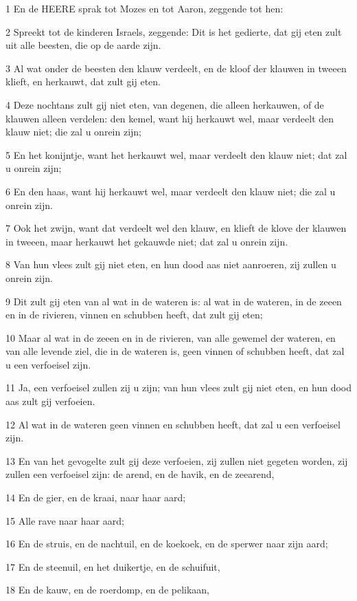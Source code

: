 \par 1 En de HEERE sprak tot Mozes en tot Aaron, zeggende tot hen:
\par 2 Spreekt tot de kinderen Israels, zeggende: Dit is het gedierte, dat gij eten zult uit alle beesten, die op de aarde zijn.
\par 3 Al wat onder de beesten den klauw verdeelt, en de kloof der klauwen in tweeen klieft, en herkauwt, dat zult gij eten.
\par 4 Deze nochtans zult gij niet eten, van degenen, die alleen herkauwen, of de klauwen alleen verdelen: den kemel, want hij herkauwt wel, maar verdeelt den klauw niet; die zal u onrein zijn;
\par 5 En het konijntje, want het herkauwt wel, maar verdeelt den klauw niet; dat zal u onrein zijn;
\par 6 En den haas, want hij herkauwt wel, maar verdeelt den klauw niet; die zal u onrein zijn.
\par 7 Ook het zwijn, want dat verdeelt wel den klauw, en klieft de klove der klauwen in tweeen, maar herkauwt het gekauwde niet; dat zal u onrein zijn.
\par 8 Van hun vlees zult gij niet eten, en hun dood aas niet aanroeren, zij zullen u onrein zijn.
\par 9 Dit zult gij eten van al wat in de wateren is: al wat in de wateren, in de zeeen en in de rivieren, vinnen en schubben heeft, dat zult gij eten;
\par 10 Maar al wat in de zeeen en in de rivieren, van alle gewemel der wateren, en van alle levende ziel, die in de wateren is, geen vinnen of schubben heeft, dat zal u een verfoeisel zijn.
\par 11 Ja, een verfoeisel zullen zij u zijn; van hun vlees zult gij niet eten, en hun dood aas zult gij verfoeien.
\par 12 Al wat in de wateren geen vinnen en schubben heeft, dat zal u een verfoeisel zijn.
\par 13 En van het gevogelte zult gij deze verfoeien, zij zullen niet gegeten worden, zij zullen een verfoeisel zijn: de arend, en de havik, en de zeearend,
\par 14 En de gier, en de kraai, naar haar aard;
\par 15 Alle rave naar haar aard;
\par 16 En de struis, en de nachtuil, en de koekoek, en de sperwer naar zijn aard;
\par 17 En de steenuil, en het duikertje, en de schuifuit,
\par 18 En de kauw, en de roerdomp, en de pelikaan,

